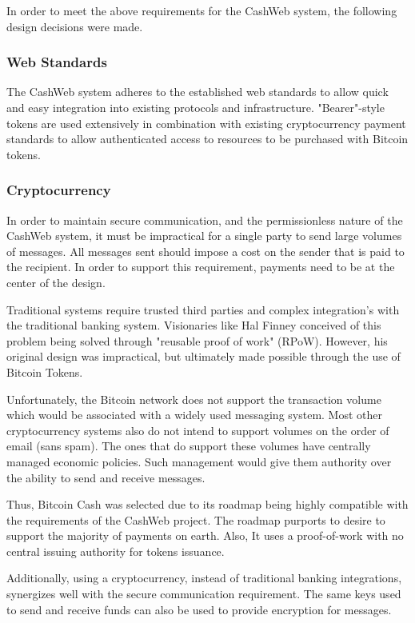 \documentclass{article}
\begin{document}
In order to meet the above requirements for the CashWeb system, the following design decisions were made.

\subsubsection{Web Standards}

The CashWeb system adheres to the established web standards to allow quick and easy integration into existing protocols and infrastructure. "Bearer"-style tokens are used extensively in combination with existing cryptocurrency payment standards to allow authenticated access to resources to be purchased with Bitcoin tokens.

\subsubsection{Cryptocurrency}

In order to maintain secure communication, and the permissionless nature of the CashWeb system, it must be impractical for a single party to send large volumes of messages. All messages sent should impose a cost on the sender that is paid to the recipient. In order to support this requirement, payments need to be at the center of the design.

Traditional systems require trusted third parties and complex integration's with the traditional banking system. Visionaries like Hal Finney conceived of this problem being solved through "reusable proof of work" (RPoW). However, his original design was impractical, but ultimately made possible through the use of Bitcoin Tokens.

Unfortunately, the Bitcoin network does not support the transaction volume which would be associated with a widely used messaging system. Most other cryptocurrency systems also do not intend to support volumes on the order of email (sans spam). The ones that do support these volumes have centrally managed economic policies. Such management would give them authority over the ability to send and receive messages.

Thus, Bitcoin Cash was selected due to its roadmap being highly compatible with the requirements of the CashWeb project. The roadmap purports to desire to support the majority of payments on earth. Also, It uses a proof-of-work with no central issuing authority for tokens issuance.

Additionally, using a cryptocurrency, instead of traditional banking integrations, synergizes well with the secure communication requirement. The same keys used to send and receive funds can also be used to provide encryption for messages.
\end{document}
